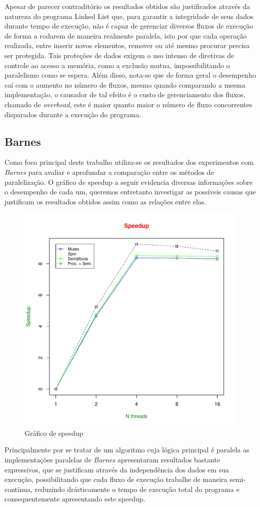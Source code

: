 \documentclass[12pt]{article}
\begin{document}
Apesar de parecer contraditório os resultados obtidos são justificados através da natureza do programa Linked List que, para garantir a integridade de seus dados durante tempo de execução, não é capaz de gerenciar diversos fluxos de execução de forma a rodarem de maneira realmente paralela, isto por que cada operação realizada, entre inserir novos elementos, remover ou até mesmo procurar precisa ser protegida. Tais proteções de dados exigem o uso intenso de diretivas de controle ao acesso a memória, como a exclusão mutua, impossibilitando o paralelismo como se espera. Além disso, nota-se que de forma geral o desempenho caí com o aumento no número de fluxos, mesmo quando comparando a mesma implementação, o causador de tal efeito é o custo de gerenciamento dos fluxos, chamado de \textit{overhead}, este é maior quanto maior o número de fluxo concorrentes disparados durante a execução do programa. 

\subsection{Barnes}
Como foco principal deste trabalho utiliza-se os resultados dos experimentos com \textit{Barnes} para avaliar e aprofundar a comparação entre os métodos de paralelização. O gráfico de speedup a seguir evidencia diversas informações sobre o desempenho de cada um, queremos entretanto investigar as possíveis causas que justificam os resultados obtidos assim como as relações entre elas. 

\begin{figure}[ht]
\centering
\includegraphics[width=.6\textwidth]{b_sp.pdf}
\caption{Gráfico de speedup}
\label{fig:exampleFig1}
\end{figure}

Principalmente por se tratar de um algoritmo cuja lógica principal é paralela as implementações paralelas de \textit{Barnes} apresentaram resultados bastante expressivos, que se justificam através da independência dos dados em sua execução, possibilitando que cada fluxo de execução trabalhe de maneira semi-contínua, reduzindo drásticamente o tempo de execução total do programa e consequentemente apresentando este speedup.
\end{document}
